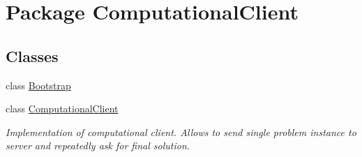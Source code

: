 \hypertarget{namespace_computational_client}{}\section{Package Computational\+Client}
\label{namespace_computational_client}
\subsection*{Classes}
\begin{DoxyCompactItemize}
\item 
class \hyperlink{class_computational_client_1_1_bootstrap}{Bootstrap}
\item 
class \hyperlink{class_computational_client_1_1_computational_client}{Computational\+Client}
\begin{DoxyCompactList}\small\item\em Implementation of computational client. Allows to send single problem instance to server and repeatedly ask for final solution. \end{DoxyCompactList}\end{DoxyCompactItemize}
